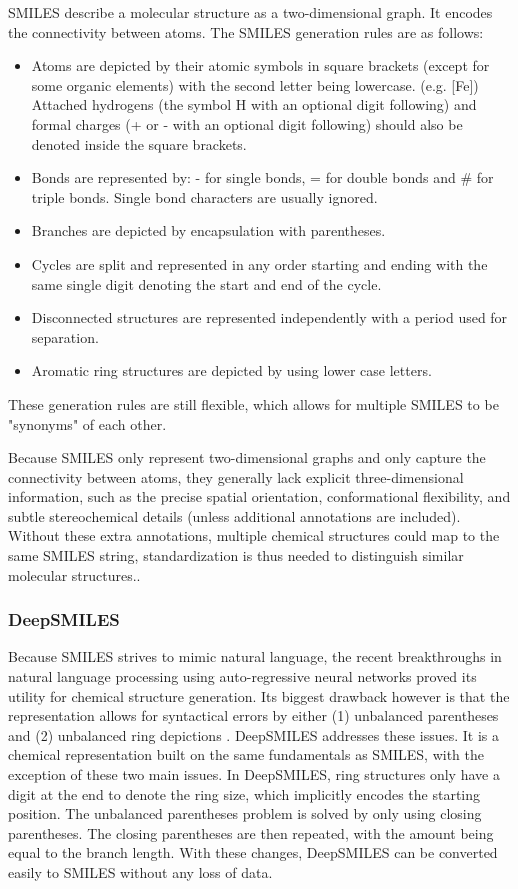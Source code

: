 SMILES describe a molecular structure as a two-dimensional graph. It encodes the connectivity between atoms.
The SMILES generation rules are as follows:

\begin{itemize}
    \item Atoms are depicted by their atomic symbols in square brackets (except for some organic elements) with the second letter being lowercase. (e.g. [Fe])
    Attached hydrogens (the symbol H with an optional digit following) and formal charges (+ or - with an optional digit following) should also be denoted inside the square brackets.
    \item Bonds are represented by: - for single bonds, = for double bonds and \# for triple bonds. Single bond characters are usually ignored.
    \item Branches are depicted by encapsulation with parentheses.
    \item Cycles are split and represented in any order starting and ending with the same single digit denoting the start and end of the cycle.
    \item Disconnected structures are represented independently with a period used for separation.
    \item Aromatic ring structures are depicted by using lower case letters.
\end{itemize}

These generation rules are still flexible, which allows for multiple SMILES to be "synonyms" of each other.

Because SMILES only represent two-dimensional graphs and only capture the connectivity between atoms, 
they generally lack explicit three-dimensional information, such as the precise spatial orientation, conformational flexibility, and subtle stereochemical details (unless additional annotations are included). Without these extra annotations, multiple chemical structures could map to the same SMILES string, standardization is thus needed to distinguish similar molecular structures.\cite{heller2015inchi}.   

\subsubsection{DeepSMILES}

Because SMILES strives to mimic natural language, the recent breakthroughs in natural language processing using auto-regressive neural networks proved its utility for chemical structure generation.
Its biggest drawback however is that the representation allows for syntactical errors by either (1) unbalanced parentheses and (2) unbalanced ring depictions \cite{o2018deepsmiles}. DeepSMILES \cite{o2018deepsmiles} addresses these issues.
It is a chemical representation built on the same fundamentals as SMILES, with the exception of these two main issues.
In DeepSMILES, ring structures only have a digit at the end to denote the ring size, which implicitly encodes the starting position.
The unbalanced parentheses problem is solved by only using closing parentheses.
The closing parentheses are then repeated, with the amount being equal to the branch length.
With these changes, DeepSMILES can be converted easily to SMILES without any loss of data.

